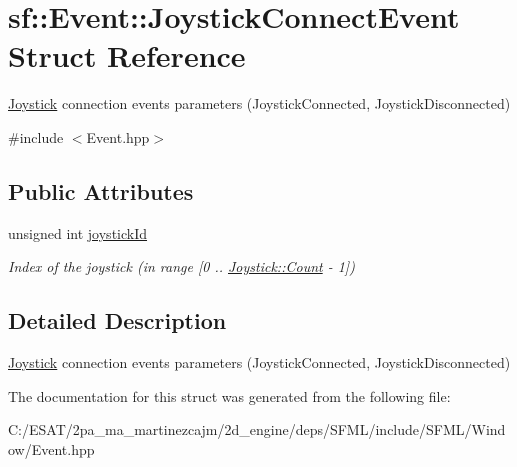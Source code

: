 \hypertarget{structsf_1_1_event_1_1_joystick_connect_event}{}\section{sf\+:\+:Event\+:\+:Joystick\+Connect\+Event Struct Reference}
\label{structsf_1_1_event_1_1_joystick_connect_event}


\hyperlink{classsf_1_1_joystick}{Joystick} connection events parameters (Joystick\+Connected, Joystick\+Disconnected)  




{\ttfamily \#include $<$Event.\+hpp$>$}

\subsection*{Public Attributes}
\begin{DoxyCompactItemize}
\item 
\mbox{\label{structsf_1_1_event_1_1_joystick_connect_event_a08e58e8559d3e4fe4654855fec79194b}} 
unsigned int \hyperlink{structsf_1_1_event_1_1_joystick_connect_event_a08e58e8559d3e4fe4654855fec79194b}{joystick\+Id}
\begin{DoxyCompactList}\small\item\em Index of the joystick (in range \mbox{[}0 .. \hyperlink{classsf_1_1_joystick_a21be587f472619c1230b6aa746ce0c79a6e0a2a95bc1da277610c04d80f52715e}{Joystick\+::\+Count} -\/ 1\mbox{]}) \end{DoxyCompactList}\end{DoxyCompactItemize}


\subsection{Detailed Description}
\hyperlink{classsf_1_1_joystick}{Joystick} connection events parameters (Joystick\+Connected, Joystick\+Disconnected) 

The documentation for this struct was generated from the following file\+:\begin{DoxyCompactItemize}
\item 
C\+:/\+E\+S\+A\+T/2pa\+\_\+ma\+\_\+martinezcajm/2d\+\_\+engine/deps/\+S\+F\+M\+L/include/\+S\+F\+M\+L/\+Window/Event.\+hpp\end{DoxyCompactItemize}

